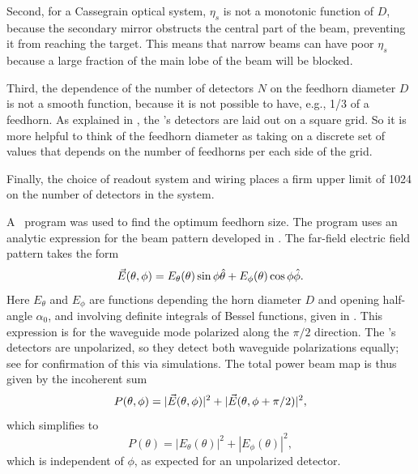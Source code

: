 Second, for a Cassegrain optical system, $\eta_s$ is not a monotonic function of $D$, because the secondary mirror obstructs the central part of the beam, preventing it from reaching the target.
This means that narrow beams can have poor $\eta_s$ because a large fraction of the main lobe of the beam will be blocked.

Third, the dependence of the number of detectors $N$ on the feedhorn diameter $D$ is not a smooth function, because it is not possible to have, e.g., 1/3 of a feedhorn.
As explained in , the \Imager's detectors are laid out on a square grid.
So it is more helpful to think of the feedhorn diameter as taking on a discrete set of values that depends on the number of feedhorns per each side of the grid.

Finally, the choice of readout system and wiring places a firm upper limit of \num{1024} on the number of detectors in the system.

A \MATLAB\ program was used to find the optimum feedhorn size.
The program uses an analytic expression for the beam pattern developed in \cite{green_radiation_2006,narasimhan_modes_1971,}.
The far-field electric field pattern takes the form
\begin{equation}
    \vec{E}(\theta,\phi) = E_{\theta}(\theta) \sin{\phi} \hat{\theta} + E_{\phi}(\theta) \cos{\phi} \hat{\phi}.
\end{equation}
Here $E_{\theta}$ and $E_{\phi}$ are functions depending the horn diameter $D$ and opening half-angle $\alpha_0$, and involving definite integrals of Bessel functions, given in \cite{green_radiation_2006,narasimhan_modes_1971}.
This expression is for the waveguide mode polarized along the $\pi/2$ direction.
The \Imager's detectors are unpolarized, so they detect both waveguide polarizations equally; see  for confirmation of this via simulations.
The total power beam map is thus given by the incoherent sum
\begin{equation}
    P(\theta, \phi) = |\vec{E}(\theta, \phi)|^2 + |\vec{E}(\theta, \phi+\pi/2)|^2,
\end{equation}
which simplifies to 
\begin{equation}
    P(\theta) = |E_{\theta}(\theta)|^2 + |E_{\phi}(\theta)|^2,
\end{equation}
which is independent of $\phi$, as expected for an unpolarized detector.

